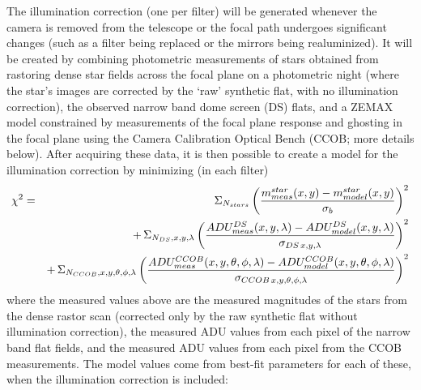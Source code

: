 \documentclass[12pt,preprint]{aastex}
\begin{document}
The illumination correction (one per filter) will be generated
whenever the camera is removed from the telescope or the focal path
undergoes significant changes (such as a filter being replaced or the
mirrors being realuminized). It will be created by combining
photometric measurements of stars obtained from rastoring dense star
fields across the focal plane on a photometric night (where the star's
images are corrected by the `raw' synthetic flat, with no illumination
correction), the observed narrow band dome screen (DS) flats, and a
ZEMAX model constrained by measurements of the focal plane response
and ghosting in the focal plane using the Camera Calibration Optical
Bench (CCOB; more details below). After acquiring these data, it is then possible to
create a model for the illumination correction by minimizing (in each
filter)
\begin{eqnarray}
 \chi^2 & = & \Sigma_{N_{stars}} \left( { m^{star}_{meas}(x,y) - m^{star}_{model}(x,y)
\over \sigma_b} \right)^2  \\
  & & +\, \Sigma_{N_{DS}, x,y,\lambda} \left( {
    ADU^{DS}_{meas}(x,y,\lambda) - ADU^{DS}_{ model}(x,y,\lambda) \over
    \sigma_{DS \, x,y,\lambda } } \right)^2  \nonumber  \\
 & & +\,  \Sigma_{N_{CCOB},x,y,\theta,\phi,\lambda} \left( { 
   ADU^{CCOB}_{meas}(x,y,\theta,\phi,\lambda) - ADU^{CCOB}_{model}(x,y,\theta,\phi,\lambda) \over
   \sigma_{CCOB \,x,y,\theta,\phi,\lambda}}  \right)^2   \nonumber
\end{eqnarray}
where the measured values above are the measured magnitudes of the stars
from the dense rastor scan (corrected only by the raw synthetic flat
without illumination correction), the measured ADU values from each pixel of the narrow band
flat fields, and the measured ADU values from each pixel from the CCOB
measurements. The model values come from best-fit parameters for each
of these, when the illumination correction is included: 
\end{document}
